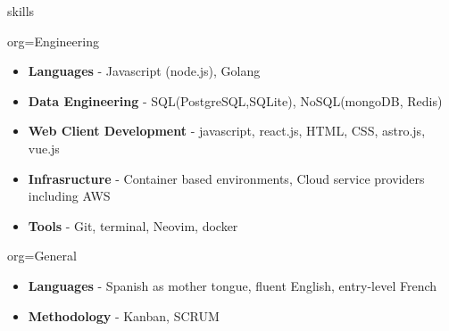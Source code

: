 \documentclass{resume}
\begin{document}
\makeheader

\begin{ResumeSection}{skills}
    \newcommand{\skill}[2]{\textbf{#1} - #2}
    \begin{ResumeSubsection}{org=Engineering}
        \begin{itemize}
            \item \skill{Languages}{Javascript (node.js), Golang}
            \item \skill{Data Engineering}{SQL(PostgreSQL,SQLite), NoSQL(mongoDB, Redis)}
            \item \skill{Web Client Development}{javascript, react.js, HTML, CSS, astro.js, vue.js}
            \item \skill{Infrasructure}{Container based environments, Cloud service providers including AWS}
            \item \skill{Tools}{Git, terminal, Neovim, docker}
        \end{itemize}
    \end{ResumeSubsection}
    \begin{ResumeSubsection}{org=General}
        \begin{itemize}
            \item \skill{Languages}{Spanish as mother tongue, fluent English, entry-level French}
            \item \skill{Methodology}{Kanban, SCRUM}
        \end{itemize}
    \end{ResumeSubsection}
\end{ResumeSection}
\end{document}

